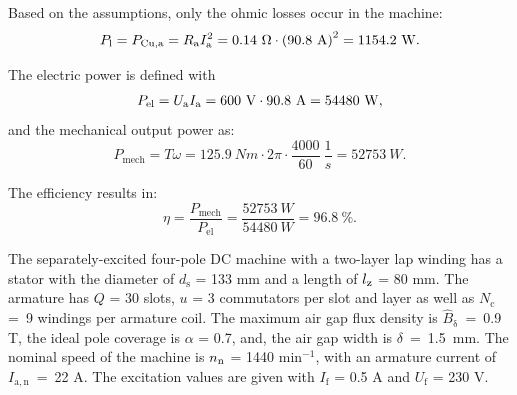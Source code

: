 

\begin{solutionblock}
    Based on the assumptions, only the ohmic losses occur in the machine:
    \begin{equation}
        \Pl = \Pcu = \Ra I_{\mathrm{a}}^2
        = 0.14 \ \si{\Omega} \cdot \left(90.8 \ \si{A} \right)^2
        = 1154.2 \ \si{W}.
    \end{equation}
   

\end{solutionblock}





\begin{solutionblock}

    The electric power is defined with
    \begin{equation}
        P_{\mathrm{el}} = \Ua \Ia
        = 600 \ \si{V} \cdot 90.8 \ \si{A}
        = 54480 \ \si{W},
    \end{equation}
    and the mechanical output power as:
    \begin{equation}
        P_{\mathrm{mech}} = T \omega 
        = 125.9 \ \si{Nm} \cdot 2 \pi \cdot \frac{4000}{60} \ \si{\frac{1}{s}}
        = 52753\ \si{W}.
    \end{equation}

    The efficiency results in:
    \begin{equation}
        \eta = \frac{P_{\mathrm{mech}}}{P_{\mathrm{el}}}
        = \frac{52753 \ \si{W}}{54480 \ \si{W}}
        = 96.8 \ \%.
    \end{equation}
\end{solutionblock}




The separately-excited four-pole DC machine with a two-layer lap winding has a stator with the diameter of $d_{\mathrm{s}}$ = 133 mm and a length of $\lz$ = 80 mm.
The armature has $Q$ = 30 slots, $u$ = 3 commutators per slot and layer as well as $N_{\mathrm{c}}~$=~9 windings per armature coil.
The maximum air gap flux density is $\hat{B}_{\updelta}$~=~0.9 T, the ideal pole coverage is $\alpha$ = 0.7, and, the air gap width is $\delta$~=~1.5~mm.
The nominal speed of the machine is $\nN$ = 1440 $\mathrm{min}^{-1}$, with an armature current of $I_{\mathrm{a,n}}$~=~22 A. The excitation values are given with $I_{\mathrm{f}}$ = 0.5 A and $U_{\mathrm{f}}$ = 230 V.



